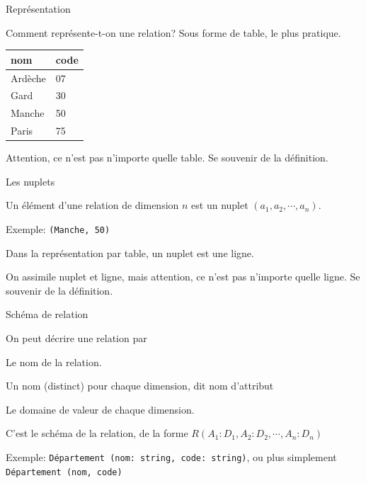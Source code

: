 \begin{frame}{Représentation}

Comment représente-t-on une relation? Sous forme de table, le plus pratique.

\vfill

\begin{tabular}{l|l}
\textbf{nom} & \textbf{code}\\ \hline
  Ardèche & 07\\
   Gard & 30\\
   Manche & 50\\
   Paris& 75\\ \hline
\end{tabular}

\vfill

\begin{blocgauche}
Attention, ce n'est pas \alert{n'importe quelle table}. Se
souvenir de la définition.
\end{blocgauche}

\end{frame}


\begin{frame}{Les nuplets}

Un élément d'une relation de dimension $n$ est un \alert{nuplet}
$(a_1, a_2, \cdots, a_n)$.

\vfill

Exemple: \texttt{(Manche, 50)}
\vfill

Dans la représentation par table, 
un nuplet est une ligne. 

\vfill

\begin{blocgauche}
On assimile nuplet et ligne, mais attention, ce n'est pas \alert{n'importe quelle ligne}. Se
souvenir de la définition.
\end{blocgauche}

\end{frame}


\begin{frame}{Schéma de relation}

On peut  \alert{décrire} une relation par 

\begin{redbullet}
  \item Le nom de la relation.
  \item Un nom (distinct) pour chaque dimension, dit \alert{nom d'attribut}
  \item Le domaine de valeur de chaque dimension.
\end{redbullet}

\vfill

C'est le \alert{schéma} de la relation, de la forme 
$R (A_1: D_1, A_2: D_2, \cdots, A_n: D_n)$

\vfill
\begin{blocgauche}
\alert{Exemple}:  \texttt{Département (nom: string, code: string)}, ou plus simplement
\texttt{Département (nom, code)}
\end{blocgauche}
\end{frame}


